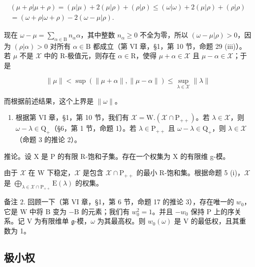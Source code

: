 \[
\begin{array}{c} (\mu + \rho | \mu + \rho) = (\mu | \mu) + 2 (\mu | \rho) + (\rho | \rho) \leq (\omega | \omega) + 2 (\mu | \rho) + (\rho | \rho) \\ = (\omega + \rho | \omega + \rho) - 2 (\omega - \mu | \rho). \end{array}
\]

现在 \(\omega - \mu = \sum_{\alpha \in \mathrm{B}} n_{\alpha} \alpha\)，其中整数 \(n_{\alpha} \geq 0\) 不全为零，所以 \((\omega - \mu | \rho) > 0\)，因为 \((\rho | \alpha) > 0\) 对所有 \(\alpha \in \mathrm{B}\) 都成立（第 VI 章，§1，第 10 节，命题 29 (iii)）。若 \(\mu\) 不是 \(\mathcal{X}\) 中的 R-极值元，则存在 \(\alpha \in \mathrm{R}\)，使得 \(\mu + \alpha \in \mathcal{X}\) 且 \(\mu - \alpha \in \mathcal{X}\)；于是

\[
\| \mu \| <   \sup (\| \mu + \alpha \|, \| \mu - \alpha \|) \leq \sup _ {\lambda \in \mathcal {X}} \| \lambda \|
\]

而根据前述结果，这个上界是 \(\|\omega\|\)。

\begin{enumerate}
\def\labelenumi{(\roman{enumi})}
\setcounter{enumi}{3}
\tightlist
\item
  根据第 VI 章，§1，第 10 节，我们有 \(\mathcal{X} = \mathrm{W.}(\mathcal{X}\cap \mathrm{P}_{++})\)。若 \(\lambda \in \mathcal{X}\)，则 \(\omega -\lambda \in \mathrm{Q}_{+}\)（§6，第 1 节，命题 1）。若 \(\lambda \in \mathrm{P}_{++}\) 且 \(\omega -\lambda \in \mathrm{Q}_{+}\)，则 \(\lambda \in \mathcal{X}\)（命题 3 的推论 2）。
\end{enumerate}

推论。设 X 是 P 的有限 R-饱和子集。存在一个权集为 X 的有限维 g-模。

由于 \(\mathcal{X}\) 在 W 下稳定，\(\mathcal{X}\) 是包含 \(\mathcal{X} \cap \mathrm{P}_{++}\) 的最小 R-饱和集。根据命题 5 (i)，\(\mathcal{X}\) 是 \(\bigoplus_{\lambda \in \mathcal{X} \cap \mathrm{P}_{++}} \mathrm{E}(\lambda)\) 的权集。

备注 2. 回顾一下（第 VI 章，§1，第 6 节，命题 17 的推论 3），存在唯一的 \(w_0\)，它是 \(\mathrm{W}\) 中将 \(\mathrm{B}\) 变为 \(-\mathrm{B}\) 的元素；我们有 \(w_0^2 = 1\)。并且 \(-w_0\) 保持 \(\mathrm{P}\) 上的序关系。记 \(\mathrm{V}\) 为有限维单 \(\mathfrak{g}\)-模，\(\omega\) 为其最高权。则 \(w_0(\omega)\) 是 \(\mathrm{V}\) 的最低权，且其重数为 1。

\subsection{极小权}


